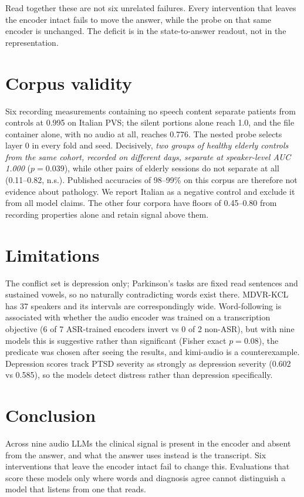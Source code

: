 \documentclass{article}
\begin{document}
Read together these are not six unrelated failures. Every intervention that leaves the encoder
intact fails to move the answer, while the probe on that same encoder is unchanged. The deficit
is in the state-to-answer readout, not in the representation.

\section{Corpus validity}\label{sec:validity}

Six recording measurements containing no speech content separate patients from controls at
0.995 on Italian PVS; the silent portions alone reach 1.0, and the file container alone,
with no audio at all, reaches 0.776. The nested probe selects layer 0 in every fold and seed.
Decisively, \emph{two groups of healthy elderly controls from the same cohort, recorded on
different days, separate at speaker-level AUC 1.000} ($p=0.039$), while other pairs of elderly
sessions do not separate at all (0.11--0.82, n.s.). Published accuracies of 98--99\% on this
corpus are therefore not evidence about pathology. We report Italian as a negative control and
exclude it from all model claims. The other four corpora have floors of 0.45--0.80 from
recording properties alone and retain signal above them.

\section{Limitations}\label{sec:limits}

The conflict set is depression only; Parkinson's tasks are fixed read sentences and sustained
vowels, so no naturally contradicting words exist there. MDVR-KCL has 37 speakers and its
intervals are correspondingly wide. Word-following is associated with whether the audio encoder
was trained on a transcription objective (6 of 7 ASR-trained encoders invert vs 0 of 2
non-ASR), but with nine models this is suggestive rather than significant (Fisher exact
$p=0.08$), the predicate was chosen after seeing the results, and kimi-audio is a
counterexample. Depression scores track PTSD severity as strongly as depression severity
(0.602 vs 0.585), so the models detect distress rather than depression specifically.

\section{Conclusion}\label{sec:conclusion}

Across nine audio LLMs the clinical signal is present in the encoder and absent from the
answer, and what the answer uses instead is the transcript. Six interventions that leave the
encoder intact fail to change this. Evaluations that score these models only where words and
diagnosis agree cannot distinguish a model that listens from one that reads.



\end{document}
